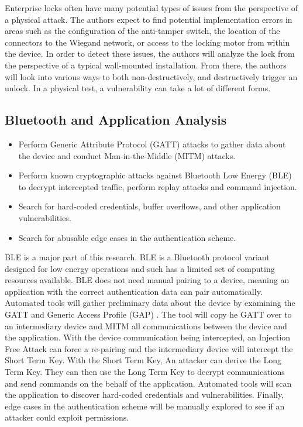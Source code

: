 \documentclass[10pt,twocolumn,letterpaper]{article}
\begin{document}
Enterprise locks often have many potential types of issues from the perspective of a physical attack.  The authors expect to find potential implementation errors in areas such as the configuration of the anti-tamper switch, the location of the connectors to the Wiegand network, or access to the locking motor from within the device.  In order to detect these issues, the authors will analyze the lock from the perspective of a typical wall-mounted installation.  From there, the authors will look into various ways to both non-destructively, and destructively trigger an unlock.  In a physical test, a vulnerability can take a lot of different forms.  

\subsection{Bluetooth and Application Analysis}
\begin{itemize}
    \item Perform Generic Attribute Protocol (GATT) attacks to gather data about the device and conduct Man-in-the-Middle (MITM) attacks. 
    \item Perform known cryptographic attacks against Bluetooth Low Energy (BLE) to decrypt intercepted traffic, perform replay attacks and command injection.
    \item Search for hard-coded credentials, buffer overflows, and other application vulnerabilities. 
    \item Search for abusable edge cases in the authentication scheme.
\end{itemize}

BLE is a major part of this research. BLE is a Bluetooth protocol variant designed for low energy operations and such has a limited set of computing resources available. BLE does not need manual pairing to a device, meaning an application with the correct authentication data can pair automatically. Automated tools will gather preliminary data about the device by examining the GATT and Generic Access Profile (GAP) . The tool will copy he GATT over to an intermediary device and MITM all communications between the device and the application. With the device communication being intercepted, an Injection Free Attack can force a re-pairing and the intermediary device will intercept the Short Term Key. With the Short Term Key,  An attacker can derive the Long Term Key. They can then use the Long Term Key to decrypt communications and send commands on the behalf of the application. Automated tools will scan the application to discover hard-coded credentials and vulnerabilities. Finally, edge cases in the authentication scheme will be manually explored to see if an attacker could exploit permissions.
\end{document}
